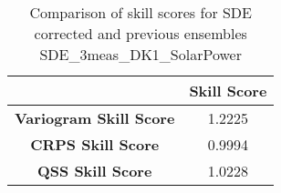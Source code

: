 
        \begin{table}[h!]
            \centering
            \begin{tabular}{|c|c|}
                \hline
                & \textbf{Skill Score}  \\
                \hline
                \textbf{Variogram Skill Score} & 1.2225  \\
                \hline
                \textbf{CRPS Skill Score} & 0.9994  \\
                \hline
                \textbf{QSS Skill Score} & 1.0228 \\
                \hline
            \end{tabular}
            \caption{Comparison of skill scores for SDE corrected and previous ensembles SDE_3meas_DK1_SolarPower}
            \label{table:skill_scores_comparison}
        \end{table}
        